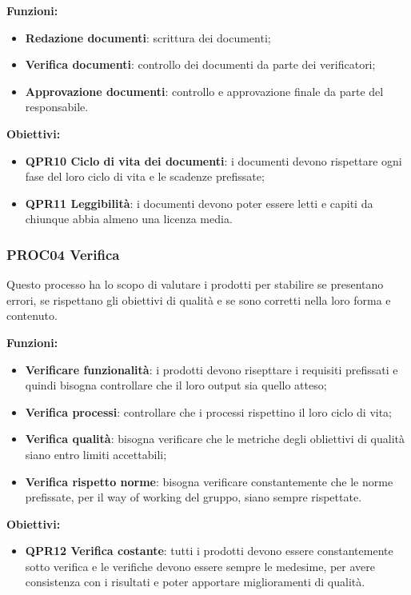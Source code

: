 \documentclass[../piano_di_qualifica.tex]{subfiles}
\begin{document}
\textbf{Funzioni:}
\smallbreak
\begin{itemize}
	\item \textbf{Redazione documenti}: scrittura dei documenti;
	\item \textbf{Verifica documenti}: controllo dei documenti da parte dei verificatori;
	\item \textbf{Approvazione documenti}: controllo e approvazione finale da parte del responsabile.
\end{itemize}

\textbf{Obiettivi:}
\smallbreak
\begin{itemize}
	\item \textbf{QPR10 Ciclo di vita dei documenti}: i documenti devono rispettare ogni fase del loro ciclo di vita e le scadenze prefissate;
	\item \textbf{QPR11 Leggibilità}: i documenti devono poter essere letti e capiti da chiunque abbia almeno una licenza media.
\end{itemize}

\subsubsection{PROC04 Verifica}
Questo processo ha lo scopo di valutare i prodotti per stabilire se presentano errori, se rispettano gli obiettivi di qualità e se sono corretti nella loro forma e contenuto.

\textbf{Funzioni:}
\smallbreak
\begin{itemize}
	\item \textbf{Verificare funzionalità}:  i prodotti devono risepttare i requisiti prefissati e quindi bisogna controllare che il loro output sia quello atteso;
	\item \textbf{Verifica processi}:  controllare che i processi rispettino il loro ciclo di vita;
	\item \textbf{Verifica qualità}:  bisogna verificare che le metriche degli obliettivi di qualità siano entro limiti accettabili;
	\item \textbf{Verifica rispetto norme}: bisogna verificare constantemente che le norme prefissate, per il way of working del gruppo, siano sempre rispettate.
\end{itemize}

\textbf{Obiettivi:}
\smallbreak
\begin{itemize}
	\item \textbf{QPR12 Verifica costante}: tutti i prodotti devono essere constantemente sotto verifica e le verifiche devono essere sempre le medesime, per avere consistenza con i risultati e poter apportare miglioramenti di qualità.
\end{itemize}
\end{document}
